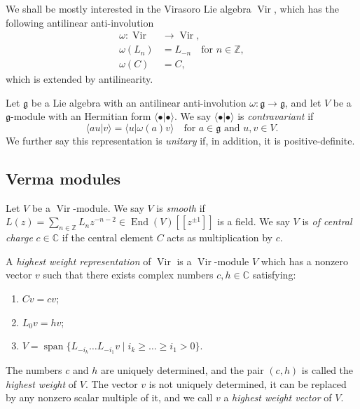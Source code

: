 \documentclass[a4paper, 12pt, reqno]{amsart}
\theoremstyle{remark}
\numberwithin{equation}{subsection}
\DeclareMathOperator{\Vir}{Vir}
\DeclareMathOperator{\End}{End}
\DeclareMathOperator{\vspan}{span}
\begin{document}
We shall be mostly interested in the Virasoro Lie algebra $\Vir$, which has the following antilinear anti-involution
\begin{align*}
  \omega: \Vir &\to \Vir, \\
  \omega(L_n) &= L_{-n} \quad \text{for }n \in \mathbb{Z}, \\
  \omega(C) &= C,
\end{align*}
which is extended by antilinearity.

Let $\mathfrak{g}$ be a Lie algebra with an antilinear anti-involution $\omega: \mathfrak{g} \to \mathfrak{g}$, and let $V$ be a $\mathfrak{g}$-module with an Hermitian form $\langle\bullet| \bullet\rangle$.
We say $\langle\bullet| \bullet\rangle$ is \emph{contravariant} if
\begin{equation*}
  \langle au| v\rangle = \langle u| \omega(a)v\rangle \quad \text{for }a \in \mathfrak{g}\text{ and }u, v \in V.
\end{equation*}
We further say this representation is \emph{unitary} if, in addition, it is positive-definite.

\subsection{Verma modules}
\label{sec:verma-modules}

Let $V$ be a $\Vir$-module.
We say $V$ is \emph{smooth} if $L(z) = \sum_{n \in \mathbb{Z}}L_{n}z^{-n - 2} \in \End(V)[[z^{\pm 1}]]$ is a field.
We say $V$ is \emph{of central charge} $c \in \mathbb{C}$ if the central element $C$ acts as multiplication by $c$.

A \emph{highest weight representation} of $\Vir$ is a $\Vir$-module $V$ which has a nonzero vector $v$ such that there exists complex numbers $c, h \in \mathbb{C}$ satisfying:
\begin{enumerate}
  \item $Cv = cv$;
  \item $L_0v = hv$;
  \item $V = \vspan\{L_{-i_k}\dots L_{-i_1}v \mid i_k \ge \dots \ge i_1 > 0\}$.
\end{enumerate}
The numbers $c$ and $h$ are uniquely determined, and the pair $(c, h)$ is called the \emph{highest weight} of $V$.
The vector $v$ is not uniquely determined, it can be replaced by any nonzero scalar multiple of it, and we call $v$ a \emph{highest weight vector} of $V$.
\end{document}
